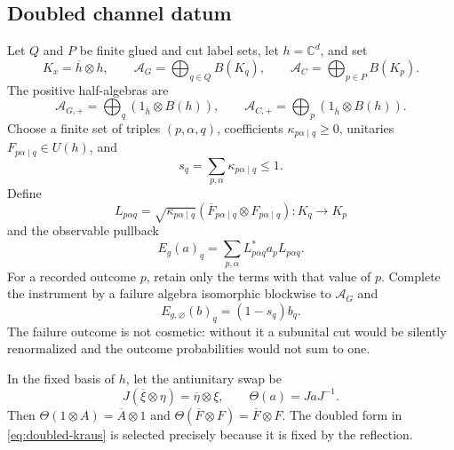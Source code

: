 \documentclass[11pt,a4paper]{article}
\theoremstyle{definition}
\theoremstyle{remark}
\newcommand{\C}{\mathbb C}
\newcommand{\A}{\mathcal A}
\begin{document}
\subsection{Doubled channel datum}

Let $Q$ and $P$ be finite glued and cut label sets, let $h=\C^d$, and set
\begin{equation}
 K_x=\overline h\otimes h,\qquad
 \A_G=\bigoplus_{q\in Q}B(K_q),\qquad
 \A_C=\bigoplus_{p\in P}B(K_p).
 \label{eq:route-algebras}
\end{equation}
The positive half-algebras are
\begin{equation}
 \A_{G,+}=\bigoplus_q(1_{\overline h}\otimes B(h)),\qquad
 \A_{C,+}=\bigoplus_p(1_{\overline h}\otimes B(h)).
\end{equation}
Choose a finite set of triples $(p,\alpha,q)$, coefficients
$\kappa_{p\alpha\mid q}\geq0$, unitaries $F_{p\alpha\mid q}\in U(h)$, and
\begin{equation}
 s_q=\sum_{p,\alpha}\kappa_{p\alpha\mid q}\leq1.
\end{equation}
Define
\begin{equation}
 L_{p\alpha q}=\sqrt{\kappa_{p\alpha\mid q}}
       (\overline F_{p\alpha\mid q}\otimes F_{p\alpha\mid q}):K_q\to K_p
 \label{eq:doubled-kraus}
\end{equation}
and the observable pullback
\begin{equation}
 E_g(a)_q=\sum_{p,\alpha}L_{p\alpha q}^*a_pL_{p\alpha q}.
 \label{eq:route-cut}
\end{equation}
For a recorded outcome $p$, retain only the terms with that value of $p$.  Complete the
instrument by a failure algebra isomorphic blockwise to $\A_G$ and
\begin{equation}
 E_{g,\varnothing}(b)_q=(1-s_q)b_q.
 \label{eq:failure-map}
\end{equation}
The failure outcome is not cosmetic: without it a subunital cut would be silently
renormalized and the outcome probabilities would not sum to one.

In the fixed basis of $h$, let the antiunitary swap be
\begin{equation}
 J(\overline\xi\otimes\eta)=\overline\eta\otimes\xi,
 \qquad \Theta(a)=JaJ^{-1}.
 \label{eq:swap-reflection}
\end{equation}
Then $\Theta(1\otimes A)=\overline A\otimes1$ and
$\Theta(\overline F\otimes F)=\overline F\otimes F$.  The doubled form in
\eqref{eq:doubled-kraus} is selected precisely because it is fixed by the reflection.
\end{document}
